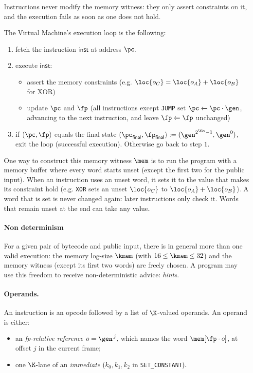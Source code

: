 Instructions never modify the memory witness: they only assert constraints on it, and the execution fails as soon as one does not hold.

\vspace{5mm}

The Virtual Machine's execution loop is the following:
\begin{enumerate}
  \item fetch the instruction $\mathsf{inst}$ at address $\pc$.
  \item execute $\mathsf{inst}$:
    \begin{itemize}
      \item assert the memory constraints (e.g. $\loc{o_C}=\loc{o_A}+\loc{o_B}$ for XOR)
      \item update $\pc$ and $\fp$ (all instructions except \texttt{JUMP} set $\pc \xleftarrow{} \pc \cdot \gen$, advancing to the next instruction, and leave $\fp \xleftarrow{} \fp$ unchanged)
    \end{itemize}
  \item if $(\pc,\fp)$ equals the final state $(\pc_{\textsf{final}},\fp_{\textsf{final}}) := (\gen^{2^{\kbc}-1},\gen^{0})$, exit the loop (successful execution). Otherwise go back to step $1.$
\end{enumerate}

One way to construct this memory witness $\mem$ is to run the program with a memory buffer where every word starts unset (except the first two for the public input). When an instruction uses an unset word, it sets it to the value that makes its constraint hold (e.g. \texttt{XOR} sets an unset $\loc{o_C}$ to $\loc{o_A}+\loc{o_B}$). A word that is set is never changed again: later instructions only check it. Words that remain unset at the end can take any value.

\paragraph{Non determinism}

For a given pair of bytecode and public input, there is in general more than one valid execution: the memory log-size $\kmem$ (with $16\le\kmem\le 32$) and the memory witness (except its first two words) are freely chosen. A program may use this freedom to receive non-deterministic advice: \emph{hints}.

\paragraph{Operands.} An instruction is an opcode followed by a list of $\K$-valued operands. An operand is either:
\begin{itemize}
  \item an \emph{fp-relative reference} $o=\gen^{\,j}$, which names the word $\mem[\fp\cdot o]$, at offset $j$ in the current frame;
  \item one $\K$-lane of an \emph{immediate} ($k_0,k_1,k_2$ in \texttt{SET\_CONSTANT}).
\end{itemize}

